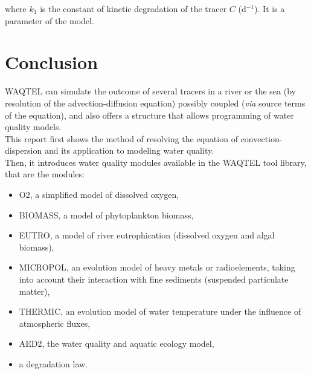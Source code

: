 \documentclass[Waqtel]{../../data/TelemacDoc} %
\begin{document}
where $k_1$ is the constant of kinetic degradation of the tracer $C$ (d$^{-1}$).
It is a parameter of the model.


\chapter{Conclusion}

WAQTEL can simulate the outcome of several tracers in a river or the sea
(by resolution of the advection-diffusion equation) possibly coupled
(\textit{via} source terms of the equation),
and also offers a structure that allows programming of water quality models.\\

This report first shows the method of resolving the equation of convection-dispersion
 and its application to modeling water quality.\\

Then, it introduces water quality modules available in the WAQTEL tool library,
that are the modules:

\begin{itemize}
\item O2, a simplified model of dissolved oxygen,
\item BIOMASS, a model of phytoplankton biomass,
\item EUTRO, a model of river eutrophication (dissolved oxygen and algal biomass),
\item MICROPOL, an evolution model of heavy metals or radioelements,
  taking into account their interaction with fine sediments (suspended particulate matter),
\item THERMIC, an evolution model of water temperature under the influence of atmospheric fluxes,
\item AED2, the water quality and aquatic ecology model,
\item a degradation law.
\end{itemize}




%



\end{document}
